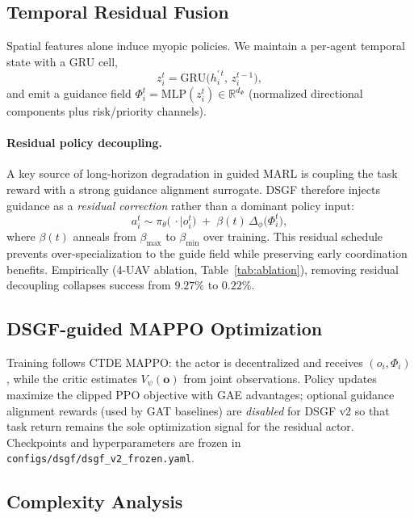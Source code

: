 \subsection{Temporal Residual Fusion}
\label{sec:temporal-residual}

Spatial features alone induce myopic policies.
We maintain a per-agent temporal state with a GRU cell,
\begin{equation}
z_i^{t}
=
\mathrm{GRU}\!\bigl(h_i^{\prime\,t},\, z_i^{t-1}\bigr),
\end{equation}
and emit a guidance field
$\Phi_i^{t}=\mathrm{MLP}(z_i^{t})\in\mathbb{R}^{d_\Phi}$
(normalized directional components plus risk/priority channels).

\paragraph{Residual policy decoupling.}
A key source of long-horizon degradation in guided MARL is coupling the
task reward with a strong guidance alignment surrogate.
DSGF therefore injects guidance as a \emph{residual correction} rather than a
dominant policy input:
\begin{equation}
a_i^{t}
\sim
\pi_\theta\!\bigl(\,\cdot\mid o_i^{t}\bigr)
\;+\;
\beta(t)\,
\Delta_\phi\!\bigl(\Phi_i^{t}\bigr),
\end{equation}
where $\beta(t)$ anneals from $\beta_{\max}$ to $\beta_{\min}$ over training.
This residual schedule prevents over-specialization to the guide field while
preserving early coordination benefits.
Empirically (4-UAV ablation, Table~\ref{tab:ablation}), removing residual
decoupling collapses success from $9.27\%$ to $0.22\%$.

\subsection{DSGF-guided MAPPO Optimization}
\label{sec:opt}

Training follows CTDE MAPPO: the actor is decentralized and receives
$(o_i,\Phi_i)$, while the critic estimates $V_\psi(\mathbf{o})$ from joint
observations.
Policy updates maximize the clipped PPO objective with GAE advantages;
optional guidance alignment rewards (used by GAT baselines) are \emph{disabled}
for DSGF v2 so that task return remains the sole optimization signal for the
residual actor.
Checkpoints and hyperparameters are frozen in
\texttt{configs/dsgf/dsgf\_v2\_frozen.yaml}.

\subsection{Complexity Analysis}
\label{sec:complexity}

